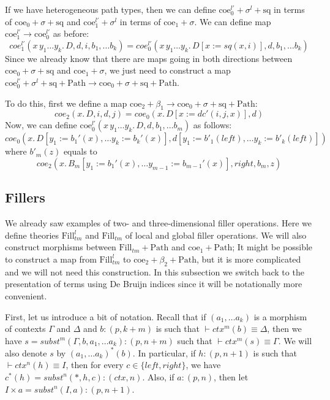 \documentclass[reqno]{amsart}
\theoremstyle{definition}
\theoremstyle{remark}
\newcommand{\deq}{\equiv}
\newcommand{\repl}{:=}
\newcommand{\coe}{\mathrm{coe}}
\newcommand{\Path}{\mathrm{Path}}
\newcommand{\sq}{\mathrm{sq}}
\newcommand{\Fill}{\mathrm{Fill}}
\newcommand{\emptyCtx}{*}
\numberwithin{figure}{section}
\begin{document}
If we have heterogeneous path types, then we can define $\coe^{l'}_0 + \sigma^l + \sq$ in terms of $\coe_0 + \sigma + \sq$ and $\coe^{l'}_1 + \sigma^l$ in terms of $\coe_1 + \sigma$.
We can define map $\coe^{l'}_1 \to \coe^{l'}_0$ as before:
\[ coe^{l'}_1(x\,y_1 \ldots y_k.\,D, d, i, b_1, \ldots b_k) = coe^{l'}_0(x\,y_1 \ldots y_k.\,D[x \repl sq(x,i)], d, b_1, \ldots b_k) \]
Since we already know that there are maps going in both directions between $\coe_0 + \sigma + \sq$ and $\coe_1 + \sigma$,
we just need to construct a map $\coe^{l'}_0 + \sigma^l + \sq + \Path \to \coe_0 + \sigma + \sq + \Path$.

To do this, first we define a map $\coe_2 + \beta_1 \to \coe_0 + \sigma + \sq + \Path$:
\[ coe_2(x.\,D, i, d, j)  = coe_0(x.\,D[x \repl dc'(i,j,x)], d) \]
Now, we can define $\coe^{l'}_0(x\,y_1 \ldots y_k.\,D, d, b_1, \ldots b_m)$ as follows:
\[ coe_0(x.\,D[y_1 \repl b_1'(x), \ldots y_k \repl b_k'(x)], d[y_1 \repl b'_1(left), \ldots y_k \repl b'_k(left)]) \]
where $b'_m(z)$ equals to
\[ coe_2(x.\,B_m[y_1 \repl b_1'(x), \ldots y_{m-1} \repl b_{m-1}'(x)], right, b_m, z) \]

\subsection{Fillers}
\label{sec:fillers}

We already saw examples of two- and three-dimensional filler operations.
Here we define theories $\Fill^l_{tm}$ and $\Fill_{tm}$ of local and global filler operations.
We will also construct morphisms between $\Fill_{tm} + \Path$ and $\coe_1 + \Path$;
It might be possible to construct a map from $\Fill^l_{tm}$ to $\coe_2 + \beta_2 + \Path$, but it is more complicated and we will not need this construction.
In this subsection we switch back to the presentation of terms using De Bruijn indices since it will be notationally more convenient.

First, let us introduce a bit of notation.
Recall that if $(a_1, \ldots a_k)$ is a morphism of contexts $\Gamma$ and $\Delta$ and $b : (p,k+m)$ is such that $\vdash ctx^m(b) \deq \Delta$,
then we have $s = subst^m(\Gamma, b, a_1, \ldots a_k) : (p,n+m)$ such that $\vdash ctx^m(s) \deq \Gamma$.
We will also denote $s$ by $(a_1, \ldots a_k)^*(b)$.
In particular, if $h : (p,n+1)$ is such that $\vdash ctx^n(h) \deq I$, then for every $c \in \{ left, right \}$, we have $c^*(h) = subst^n(\emptyCtx, h, c) : (ctx,n)$.
Also, if $a : (p,n)$, then let $I \times a = subst^n(I, a) : (p,n+1)$.
\end{document}
